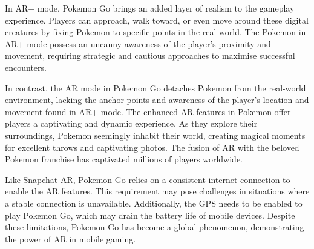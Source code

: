 In \ac{AR}+ mode, Pokemon Go brings an added layer of realism to the gameplay experience. Players can approach, walk toward, or even move around these digital creatures by fixing Pokemon to specific points in the real world. The Pokemon in \ac{AR}+ mode possess an uncanny awareness of the player's proximity and movement, requiring strategic and cautious approaches to maximise successful encounters.

In contrast, the \ac{AR} mode in Pokemon Go detaches Pokemon from the real-world environment, lacking the anchor points and awareness of the player's location and movement found in AR+ mode.
The enhanced \ac{AR} features in Pokemon offer players a captivating and dynamic experience. As they explore their surroundings, Pokemon seemingly inhabit their world, creating magical moments for excellent throws and captivating photos. The fusion of \ac{AR} with the beloved Pokemon franchise has captivated millions of players worldwide.

Like Snapchat AR, Pokemon Go relies on a consistent internet connection to enable the \ac{AR} features. This requirement may pose challenges in situations where a stable connection is unavailable. Additionally, the GPS needs to be enabled to play Pokemon Go, which may drain the battery life of mobile devices. Despite these limitations, Pokemon Go has become a global phenomenon, demonstrating the power of \ac{AR} in mobile gaming.